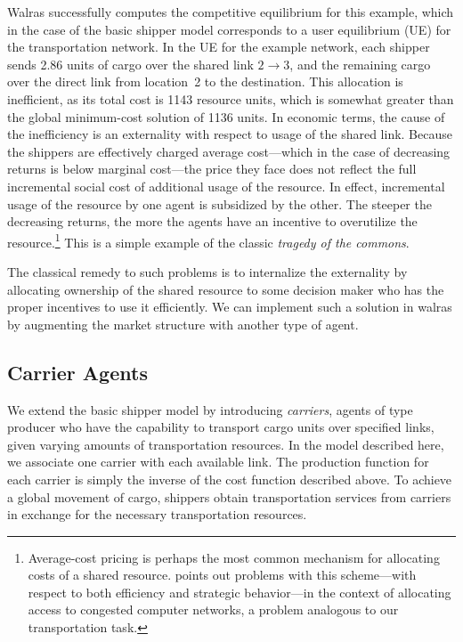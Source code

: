 {\sc Walras} successfully computes the competitive equilibrium for
this example, which in the case of the basic shipper model corresponds
to a user equilibrium (UE) for the transportation network.  In the UE
for the example network, each shipper sends 2.86 units of cargo over
the shared link $2\rightarrow3$, and the remaining cargo over the
direct link from location~2 to the destination.  This allocation is
inefficient, as its total cost is 1143 resource units, which is
somewhat greater than the global minimum-cost solution of 1136 units.
In economic terms, the cause of the inefficiency is an externality
with respect to usage of the shared link.  Because the shippers are
effectively charged average cost---which in the case of decreasing
returns is below marginal cost---the price they face does not reflect
the full incremental social cost of additional usage of the resource.
In effect, incremental usage of the resource by one agent is
subsidized by the other.  The steeper the decreasing returns, the more
the agents have an incentive to overutilize the
resource.\footnote{Average-cost pricing is perhaps the most common
mechanism for allocating costs of a shared resource.
 points out problems with this
scheme---with respect to both efficiency and strategic behavior---in
the context of allocating access to congested computer networks, a
problem analogous to our transportation task.}  This is a simple example of the 
classic {\em tragedy of the commons}.

The classical remedy to such problems is to internalize the
externality by allocating ownership of the shared resource to some
decision maker who has the proper incentives to use it efficiently.
We can implement such a solution in {\sc walras} by augmenting the
market structure with another type of agent.

\subsection{Carrier Agents}

We extend the basic shipper model by introducing {\em carriers},
agents of type producer who have the capability to transport cargo
units over specified links, given varying amounts of transportation
resources.  In the model described here, we associate one carrier with
each available link.  The production function for each carrier is simply 
the inverse of the cost function described above.  
To achieve a global movement of cargo, shippers
obtain transportation services from carriers in exchange for the
necessary transportation resources.

